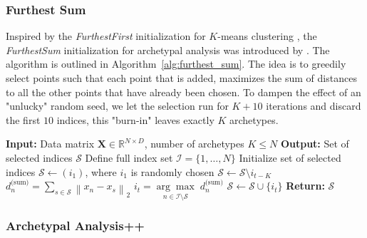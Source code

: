 \documentclass{article}
\begin{document}
\subsubsection{Furthest Sum}

Inspired by the \textit{FurthestFirst} initialization for $K$-means clustering \autocite{hochbaumBestPossibleHeuristic1985}, the \textit{FurthestSum} initialization for archetypal analysis was introduced by \textcite{morupArchetypalAnalysisMachine2012}. The algorithm is outlined in Algorithm~\ref{alg:furthest_sum}. The idea is to greedily select points such that each point that is added, maximizes the sum of distances to all the other points that have already been chosen. To dampen the effect of an "unlucky" random seed, we let the selection
run for $K+10$ iterations and discard the first $10$ indices, this "burn-in" leaves exactly $K$
archetypes.

\begin{algorithm}[H]
    \caption{Furthest Sum Initialization}
    \label{alg:furthest_sum}
    \begin{algorithmic}[1]
    \State \textbf{Input:} Data matrix $\mathbf{X} \in \mathbb{R}^{N \times D}$, number of archetypes $K \leq N$
    \State \textbf{Output:} Set of selected indices $\mathcal{S}$
    \State Define full index set $\mathcal{I} = \{1, \dots, N\}$
    \State Initialize set of selected indices $\mathcal{S} \gets \left( i_1 \right)$, where $i_1$ is randomly chosen
            \State $\mathcal{S} \gets \mathcal{S} \setminus i_{t-K}$ 
        \EndIf
         
            \State $d_n^{\text{(sum)}} = \sum_{s \in \mathcal{S}} \left\| x_n - x_s \right\|_2$
        \EndFor
    \State $i_t = \underset{n \in \mathcal{I} \setminus \mathcal{S}}{\arg \max} \; d_n^{\text{(sum)}}$ 
    \State $\mathcal{S} \gets \mathcal{S} \cup \{i_t\}$ 
    \EndFor
    \State \textbf{Return:} $\mathcal{S}$
    \end{algorithmic}
\end{algorithm}

\subsubsection{Archetypal Analysis++}
\end{document}
